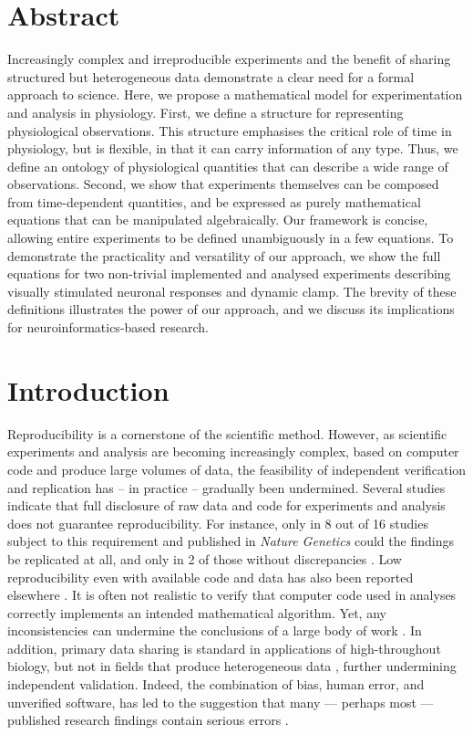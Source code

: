 
\section*{Abstract}

Increasingly complex and irreproducible experiments and the benefit of
sharing structured but heterogeneous data demonstrate a clear need for
a formal approach to science.  Here, we propose a mathematical model
for experimentation and analysis in physiology. First, we define a
structure for representing physiological observations. This structure
emphasises the critical role of time in physiology, but is flexible,
in that it can carry information of any type. Thus, we define an
ontology of physiological quantities that can describe a wide range of
observations. Second, we show that experiments themselves can be
composed from time-dependent quantities, and be expressed as purely
mathematical equations that can be manipulated algebraically. Our
framework is concise, allowing entire experiments to be defined
unambiguously in a few equations. To demonstrate the practicality and
versatility of our approach, we show the full equations for two
non-trivial implemented and analysed experiments describing visually
stimulated neuronal responses and dynamic clamp. The brevity of these
definitions illustrates the power of our approach, and we discuss its
implications for neuroinformatics-based research.

\pagebreak

\section*{Introduction}

Reproducibility is a cornerstone of the scientific method. However, as
scientific experiments and analysis are becoming increasingly complex,
based on computer code and produce large volumes of data, the
feasibility of independent verification and replication has -- in
practice -- gradually been undermined. Several studies indicate that
full disclosure of raw data and code for experiments and analysis does
not guarantee reproducibility.  For instance, only in 8 out of 16
studies subject to this requirement and published in \emph{Nature
  Genetics} could the findings be replicated at all, and only in 2 of
those without discrepancies \citep{Ioannidis2008}. Low reproducibility
even with available code and data has also been reported elsewhere
\citep{Baggerly2009, McCullough2007}. It is often not realistic to
verify that computer code used in analyses correctly implements an
intended mathematical algorithm. Yet, any inconsistencies can undermine the
conclusions of a large body of work \citep{Chang2006}.  In addition,
primary data sharing is standard in applications of high-throughout
biology, but not in fields that produce heterogeneous data
\citep{Gardner2005}, further undermining independent validation.
Indeed, the combination of bias, human error, and unverified software,
has led to the suggestion that many --- perhaps most --- published
research findings contain serious errors \citep{Ioannidis2005,
Merali2010}.

